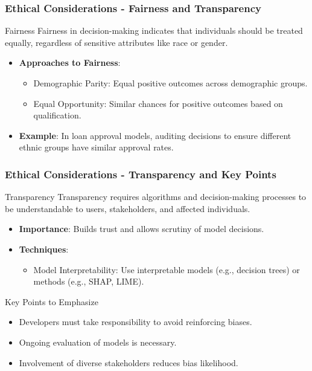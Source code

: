 \documentclass{beamer}
\begin{document}
\begin{frame}[fragile]
    \frametitle{Ethical Considerations - Fairness and Transparency}
    \begin{block}{Fairness}
        Fairness in decision-making indicates that individuals should be treated equally, regardless of sensitive attributes like race or gender.
    \end{block}
    
    \begin{itemize}
        \item \textbf{Approaches to Fairness}:
            \begin{itemize}
                \item Demographic Parity: Equal positive outcomes across demographic groups.
                \item Equal Opportunity: Similar chances for positive outcomes based on qualification.
            \end{itemize}
        \item \textbf{Example}: In loan approval models, auditing decisions to ensure different ethnic groups have similar approval rates.
    \end{itemize}
\end{frame}

\begin{frame}[fragile]
    \frametitle{Ethical Considerations - Transparency and Key Points}
    \begin{block}{Transparency}
        Transparency requires algorithms and decision-making processes to be understandable to users, stakeholders, and affected individuals.
    \end{block}
    
    \begin{itemize}
        \item \textbf{Importance}: Builds trust and allows scrutiny of model decisions.
        \item \textbf{Techniques}:
            \begin{itemize}
                \item Model Interpretability: Use interpretable models (e.g., decision trees) or methods (e.g., SHAP, LIME).
            \end{itemize}
    \end{itemize}

    \begin{block}{Key Points to Emphasize}
        \begin{itemize}
            \item Developers must take responsibility to avoid reinforcing biases.
            \item Ongoing evaluation of models is necessary.
            \item Involvement of diverse stakeholders reduces bias likelihood.
        \end{itemize}
    \end{block}
\end{frame}
\end{document}
